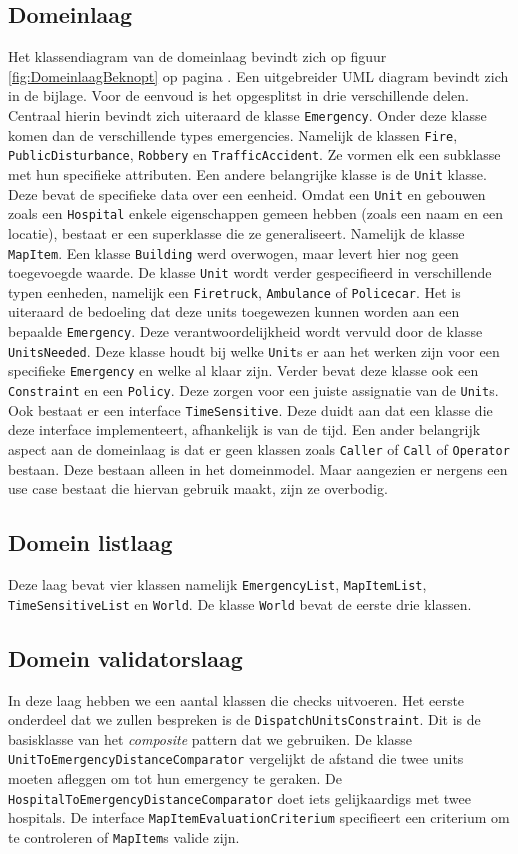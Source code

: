 \subsection{Domeinlaag}
 Het klassendiagram van de domeinlaag bevindt zich op figuur \ref{fig:DomeinlaagBeknopt} op pagina \pageref{fig:DomeinlaagBeknopt}. Een uitgebreider UML diagram bevindt zich in de bijlage. Voor de eenvoud is het opgesplitst in drie verschillende delen. Centraal hierin bevindt zich uiteraard de klasse \texttt{Emergency}. Onder deze klasse komen dan de verschillende types emergencies. Namelijk de klassen \texttt{Fire}, \texttt{PublicDisturbance}, \texttt{Robbery} en \texttt{TrafficAccident}. Ze vormen elk een subklasse met hun specifieke attributen. Een andere belangrijke klasse is de \texttt{Unit} klasse. Deze bevat de specifieke data over een eenheid. Omdat een \texttt{Unit} en gebouwen zoals een \texttt{Hospital} enkele eigenschappen gemeen hebben (zoals een naam en een locatie), bestaat er een superklasse die ze generaliseert. Namelijk de klasse \texttt{MapItem}. Een klasse \texttt{Building} werd overwogen, maar levert hier nog geen toegevoegde waarde. De klasse \texttt{Unit} wordt verder gespecifieerd in verschillende typen eenheden, namelijk een \texttt{Firetruck}, \texttt{Ambulance} of \texttt{Policecar}. Het is uiteraard de bedoeling dat deze units toegewezen kunnen worden aan een bepaalde \texttt{Emergency}. Deze verantwoordelijkheid wordt vervuld door de klasse \texttt{UnitsNeeded}. Deze klasse houdt bij welke \texttt{Unit}s  er aan het werken zijn voor een specifieke \texttt{Emergency} en welke al klaar zijn. Verder bevat deze klasse ook een \texttt{Constraint} en een \texttt{Policy}. Deze zorgen voor een juiste assignatie van de \texttt{Unit}s. Ook bestaat er een interface \texttt{TimeSensitive}. Deze duidt aan dat een klasse die deze interface implementeert, afhankelijk is van de tijd. Een ander belangrijk aspect aan de domeinlaag is dat er geen klassen zoals \texttt{Caller} of \texttt{Call} of \texttt{Operator} bestaan. Deze bestaan alleen in het domeinmodel. Maar aangezien er nergens een use case bestaat die hiervan gebruik maakt, zijn ze overbodig.
\subsection{Domein listlaag}
Deze laag bevat vier klassen namelijk \texttt{EmergencyList}, \texttt{MapItemList}, \texttt{TimeSensitiveList} en \texttt{World}. De klasse \texttt{World} bevat de eerste drie klassen.
\subsection{Domein validatorslaag}
In deze laag hebben we een aantal klassen die checks uitvoeren. Het eerste onderdeel dat we zullen bespreken is de \texttt{DispatchUnitsConstraint}. Dit is de basisklasse van het \textit{composite} pattern dat we gebruiken. De klasse \texttt{UnitToEmergencyDistanceComparator} vergelijkt de afstand die twee units moeten afleggen om tot hun emergency te geraken. De \texttt{HospitalToEmergencyDistanceComparator} doet iets gelijkaardigs met twee hospitals. De interface \texttt{MapItemEvaluationCriterium} specifieert een criterium om te controleren of \texttt{MapItem}s valide zijn.

